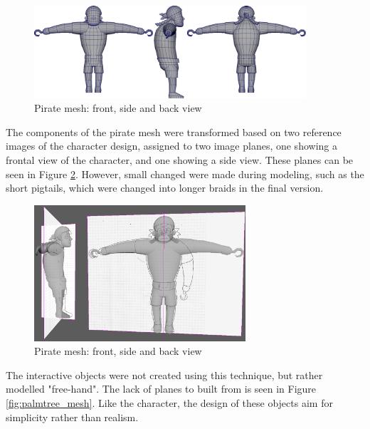 \begin{figure}[h!]
	\centering
	\includegraphics[width=0.9\textwidth]{figures/pirate_mesh.png}
	\caption{Pirate mesh: front, side and back view \label{fig:pirate_mesh}}
\end{figure}

The components of the pirate mesh were transformed based on two reference images of the character design, assigned to two image planes, one showing a frontal view of the character, and one showing a side view. These planes can be seen in Figure \ref{fig:pirate_planes}. However, small changed were made during modeling, such as the short pigtails, which were changed into longer braids in the final version.

\begin{figure}[h!]
	\centering
	\includegraphics[width=0.7\textwidth]{figures/pirate_planes.png}
	\caption{Pirate mesh: front, side and back view \label{fig:pirate_planes}}
\end{figure}

The interactive objects were not created using this technique, but rather modelled "free-hand". The lack of planes to built from is seen in Figure \ref{fig:palmtree_mesh}. Like the character, the design of these objects aim for simplicity rather than realism.

